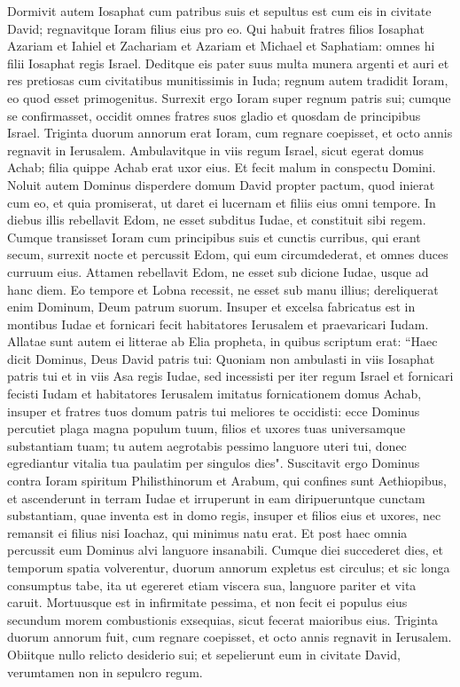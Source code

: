 \begin{biblechapter}  
\verse Dormivit autem Iosaphat cum patribus suis et sepultus est cum eis in civitate David; regnavitque Ioram filius eius pro eo. 
\verse Qui habuit fratres filios Iosaphat Azariam et Iahiel et Zachariam et Azariam et Michael et Saphatiam: omnes hi filii Iosaphat regis Israel. 
\verse Deditque eis pater suus multa munera argenti et auri et res pretiosas cum civitatibus munitissimis in Iuda; regnum autem tradidit Ioram, eo quod esset primogenitus. 
\verse Surrexit ergo Ioram super regnum patris sui; cumque se confirmasset, occidit omnes fratres suos gladio et quosdam de principibus Israel. 
\verse Triginta duorum annorum erat Ioram, cum regnare coepisset, et octo annis regnavit in Ierusalem. 
\verse Ambulavitque in viis regum Israel, sicut egerat domus Achab; filia quippe Achab erat uxor eius. Et fecit malum in conspectu Domini. 
\verse Noluit autem Dominus disperdere domum David propter pactum, quod inierat cum eo, et quia promiserat, ut daret ei lucernam et filiis eius omni tempore. 
\verse In diebus illis rebellavit Edom, ne esset subditus Iudae, et constituit sibi regem. 
\verse Cumque transisset Ioram cum principibus suis et cunctis curribus, qui erant secum, surrexit nocte et percussit Edom, qui eum circumdederat, et omnes duces curruum eius. 
\verse Attamen rebellavit Edom, ne esset sub dicione Iudae, usque ad hanc diem. Eo tempore et Lobna recessit, ne esset sub manu illius; dereliquerat enim Dominum, Deum patrum suorum. 
\verse Insuper et excelsa fabricatus est in montibus Iudae et fornicari fecit habitatores Ierusalem et praevaricari Iudam. 
\verse Allatae sunt autem ei litterae ab Elia propheta, in quibus scriptum erat: “Haec dicit Dominus, Deus David patris tui: Quoniam non ambulasti in viis Iosaphat patris tui et in viis Asa regis Iudae, 
\verse sed incessisti per iter regum Israel et fornicari fecisti Iudam et habitatores Ierusalem imitatus fornicationem domus Achab, insuper et fratres tuos domum patris tui meliores te occidisti: 
\verse ecce Dominus percutiet plaga magna populum tuum, filios et uxores tuas universamque substantiam tuam; 
\verse tu autem aegrotabis pessimo languore uteri tui, donec egrediantur vitalia tua paulatim per singulos dies". 
\verse Suscitavit ergo Dominus contra Ioram spiritum Philisthinorum et Arabum, qui confines sunt Aethiopibus, 
\verse et ascenderunt in terram Iudae et irruperunt in eam diripueruntque cunctam substantiam, quae inventa est in domo regis, insuper et filios eius et uxores, nec remansit ei filius nisi Ioachaz, qui minimus natu erat. 
\verse Et post haec omnia percussit eum Dominus alvi languore insanabili. 
\verse Cumque diei succederet dies, et temporum spatia volverentur, duorum annorum expletus est circulus; et sic longa consumptus tabe, ita ut egereret etiam viscera sua, languore pariter et vita caruit. Mortuusque est in infirmitate pessima, et non fecit ei populus eius secundum morem combustionis exsequias, sicut fecerat maioribus eius. 
\verse Triginta duorum annorum fuit, cum regnare coepisset, et octo annis regnavit in Ierusalem. Obiitque nullo relicto desiderio sui; et sepelierunt eum in civitate David, verumtamen non in sepulcro regum. 
\end{biblechapter}

